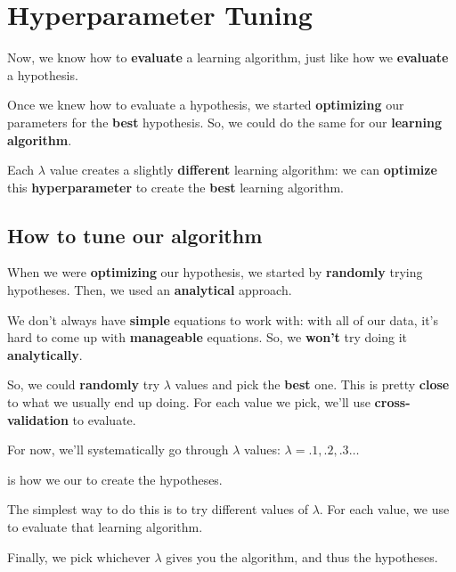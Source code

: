 \section*{Hyperparameter Tuning}
    
        Now, we know how to \textbf{evaluate} a learning algorithm, just like how we \textbf{evaluate} a hypothesis. 
        
        Once we knew how to evaluate a hypothesis, we started \textbf{optimizing} our parameters for the \textbf{best} hypothesis. So, we could do the same for our \textbf{learning algorithm}.
        
        Each $\lambda$ value creates a slightly \textbf{different} learning algorithm: we can \textbf{optimize} this \textbf{hyperparameter} to create the \textbf{best} learning algorithm.
        
    \subsection*{How to tune our algorithm}
    
        When we were \textbf{optimizing} our hypothesis, we started by \textbf{randomly} trying hypotheses. Then, we used an \textbf{analytical} approach.
        
        We don't always have \textbf{simple} equations to work with: with all of our data, it's hard to come up with \textbf{manageable} equations. So, we \textbf{won't} try doing it \textbf{analytically}.
        
        So, we could \textbf{randomly} try $\lambda$ values and pick the \textbf{best} one. This is pretty \textbf{close} to what we usually end up doing. For each value we pick, we'll use \textbf{cross-validation} to evaluate.
        
        For now, we'll systematically go through $\lambda$ values: $\lambda=.1, .2, .3 \dots$\\
        
        \begin{concept}
             is how we  our  to create the  hypotheses.
            
            The simplest way to do this is to try  different values of $\lambda$. For each value, we use  to evaluate that learning algorithm.
            
            Finally, we pick whichever $\lambda$ gives you the  algorithm, and thus the  hypotheses.
        \end{concept}
        
